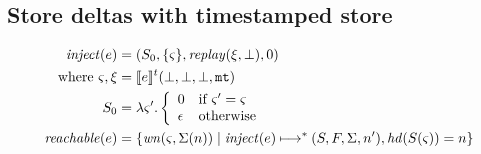 \documentclass{llncs}
\newcommand{\finto}{\mathbin{\overset{\text{fin}}{\rightharpoonup}}}
\newcommand{\inject}{\mathit{inject}}
\newcommand{\setof}[1]{\{ #1 \}}
\begin{document}

\subsection{Store deltas with timestamped store}

\begin{align*}
\inject(\mexp) &=
 (S_0, \setof{\mstate},
  \replay(\msdiff,\bot), 0) \\
 \text{ where } \mstate, \msdiff &= \compile{e}^\mcntr(\bot,\bot,\bot,\kmt) \\
                S_0 &= \lambda\mstate'.
                        \left\{\begin{array}{ll}
                         0 & \text{if } \mstate' = \mstate \\
                         \epsilon & \text{otherwise}
                        \end{array}\right. \\
\mathit{reachable}(\mexp) &=
  \setof{\wn(\mstate,\Sigma(n)) \mid
         \inject(\mexp) \machstep^* (S,F,\Sigma,n'), \hd(S(\mstate)) = n}
\end{align*}
\end{document}

